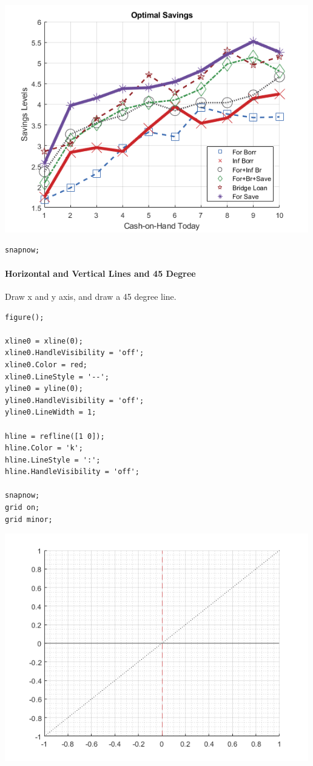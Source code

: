 \documentclass[
]{book}
\begin{document}
\includegraphics[width=5.20833in,height=\textheight]{img/fs_lines_images/figure_0.png}

\begin{verbatim}
snapnow;
\end{verbatim}

\hypertarget{horizontal-and-vertical-lines-and-45-degree}{%
\paragraph{Horizontal and Vertical Lines and 45 Degree}\label{horizontal-and-vertical-lines-and-45-degree}}

Draw x and y axis, and draw a 45 degree line.

\begin{verbatim}
figure();

xline0 = xline(0);
xline0.HandleVisibility = 'off';
xline0.Color = red;
xline0.LineStyle = '--';
yline0 = yline(0);
yline0.HandleVisibility = 'off';
yline0.LineWidth = 1;

hline = refline([1 0]);
hline.Color = 'k';
hline.LineStyle = ':';
hline.HandleVisibility = 'off';

snapnow;
grid on;
grid minor;
\end{verbatim}

\includegraphics[width=5.20833in,height=\textheight]{img/fs_lines_images/figure_1.png}
\end{document}
